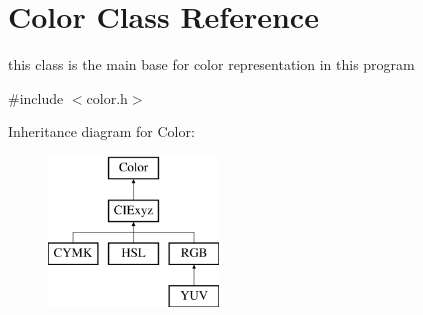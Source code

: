 \hypertarget{class_color}{}\section{Color Class Reference}
\label{class_color}


this class is the main base for color representation in this program  




{\ttfamily \#include $<$color.\+h$>$}

Inheritance diagram for Color\+:\begin{figure}[H]
\begin{center}
\leavevmode
\includegraphics[height=4.000000cm]{class_color}
\end{center}
\end{figure}
